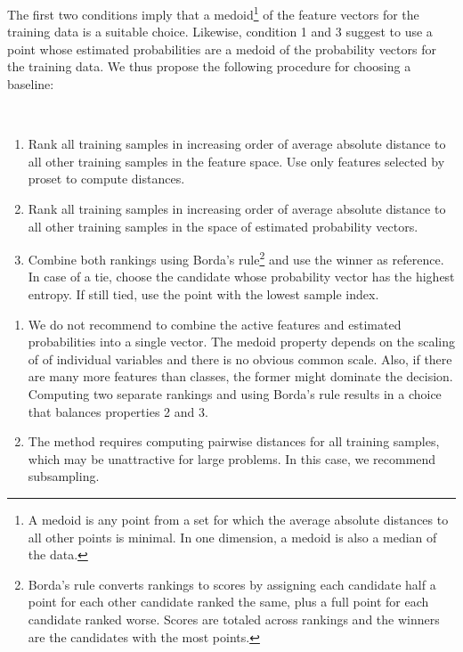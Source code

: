 The first two conditions imply that a medoid\footnote{
A medoid is any point from a set for which the average absolute distances to all other points is minimal.
In one dimension, a medoid is also a median of the data.
} of the feature vectors for the training data is a suitable choice.
Likewise, condition 1 and 3 suggest to use a point whose estimated probabilities are a medoid of the probability vectors for the training data.
We thus propose the following procedure for choosing a baseline:
%
\begin{algorithm}~
\label{alg_shap_baseline}
%
\begin{enumerate}
\item Rank all training samples in increasing order of average absolute distance to all other training samples in the feature space.
Use only features selected by proset to compute distances.
%
\item Rank all training samples in increasing order of average absolute distance to all other training samples in the space of estimated probability vectors.
%
\item Combine both rankings using Borda's rule\footnote{
Borda's rule converts rankings to scores by assigning each candidate half a point for each other candidate ranked the same, plus a full point for each candidate ranked worse.
Scores are totaled across rankings and the winners are the candidates with the most points.
} and use the winner as reference.
In case of a tie, choose the candidate whose probability vector has the highest entropy.
If still tied, use the point with the lowest sample index.
\end{enumerate}
\end{algorithm}
%
\begin{remark}
\begin{enumerate}
\item We do not recommend to combine the active features and estimated probabilities into a single vector.
The medoid property depends on the scaling of of individual variables and there is no obvious common scale.
Also, if there are many more features than classes, the former might dominate the decision.
Computing two separate rankings and using Borda's rule results in a choice that balances properties 2 and 3.
%
\item The method requires computing pairwise distances for all training samples, which may be unattractive for large problems.
In this case, we recommend subsampling.
\end{enumerate}
\end{remark}
